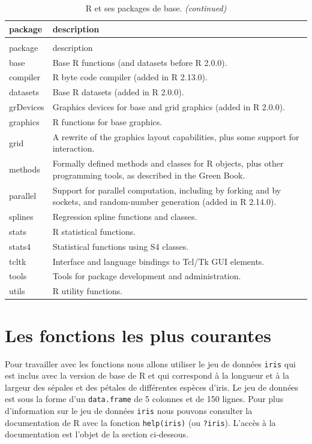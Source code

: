 \documentclass[twoside,symmetric]{book}
\begin{document}
\begin{longtable}[t]{l|>{\raggedright\arraybackslash}p{25em}}
\caption{\label{tab:tabPkg}R et ses packages de base.\label{tab:tabPkg}}\\
\hline
package & description\\
\hline
\endfirsthead
\caption[]{\label{tab:tabPkg}R et ses packages de base. \textit{(continued)}}\\
\hline
package & description\\
\hline
\endhead
base & Base R functions (and datasets before R 2.0.0).\\
\hline
compiler & R byte code compiler (added in R 2.13.0).\\
\hline
datasets & Base R datasets (added in R 2.0.0).\\
\hline
grDevices & Graphics devices for base and grid graphics (added in R 2.0.0).\\
\hline
graphics & R functions for base graphics.\\
\hline
grid & A rewrite of the graphics layout capabilities, plus some support for interaction.\\
\hline
methods & Formally defined methods and classes for R objects, plus other programming tools, as described in the Green Book.\\
\hline
parallel & Support for parallel computation, including by forking and by sockets, and random-number generation (added in R 2.14.0).\\
\hline
splines & Regression spline functions and classes.\\
\hline
stats & R statistical functions.\\
\hline
stats4 & Statistical functions using S4 classes.\\
\hline
tcltk & Interface and language bindings to Tcl/Tk GUI elements.\\
\hline
tools & Tools for package development and administration.\\
\hline
utils & R utility functions.\\
\hline
\end{longtable}

\hypertarget{l015mainfun}{%
\section{Les fonctions les plus courantes}\label{l015mainfun}}

Pour travailler avec les fonctions nous allons utiliser le jeu de données \texttt{iris} qui est inclus avec la version de base de R et qui correspond à la longueur et à la largeur des sépales et des pétales de différentes espèces d'iris. Le jeu de données est sous la forme d'un \texttt{data.frame} de 5 colonnes et de 150 lignes. Pour plus d'information sur le jeu de données \texttt{iris} nous pouvons consulter la documentation de R avec la fonction \texttt{help(iris)} (ou \texttt{?iris}). L'accès à la documentation est l'objet de la section ci-dessous.
\end{document}
